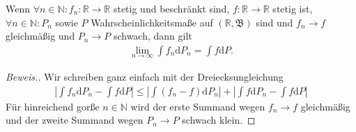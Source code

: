 \begin{lemma}
    Wenn $\forall n\in\mathbb{N}:f_n:\mathbb{R}\to\mathbb{R}$ stetig und beschränkt sind, $f:\mathbb{R}\to\mathbb{R}$ stetig ist, $\forall n\in\mathbb{N}:P_n$ sowie $P$ Wahrscheinlichkeitsmaße auf $(\mathbb{R},\mathfrak{B})$ sind und $f_n\to f$ gleichmäßig und $P_n\to P$ schwach, dann gilt
    \begin{align*}
        \lim_{n\to\infty}\int f_n\mathrm{d}P_n=\int f\mathrm{d}P.
    \end{align*}
\end{lemma}
\begin{proof}[Beweis.]
    Wir schreiben ganz einfach mit der Dreiecksungleichung
    \begin{align*}
        \left\vert\int f_n\mathrm{d}P_n-\int f\mathrm{d}P\right\vert\leq\left\vert\int (f_n-f)\mathrm{d}P_n\right\vert+\left\vert\int f\mathrm{d}P_n-\int f\mathrm{d}P\right\vert
    \end{align*}
    Für hinreichend gorße $n\in\mathbb{N}$ wird der erste Summand wegen $f_n\to f$ gleichmäßig und der zweite Summand wegen $P_n\to P$ schwach klein.
\end{proof}
